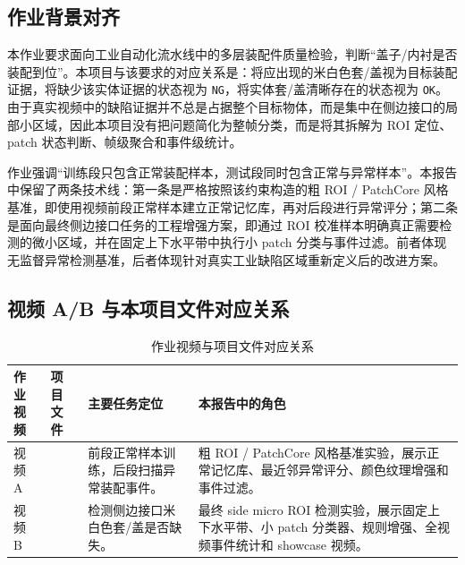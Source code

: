 \documentclass[a4paper,12pt]{article}
\newcommand{\code}[1]{\texttt{#1}}
\begin{document}
\subsection{作业背景对齐}
本作业要求面向工业自动化流水线中的多层装配件质量检验，判断“盖子/内衬是否装配到位”。本项目与该要求的对应关系是：将应出现的米白色套/盖视为目标装配证据，将缺少该实体证据的状态视为 \code{NG}，将实体套/盖清晰存在的状态视为 \code{OK}。由于真实视频中的缺陷证据并不总是占据整个目标物体，而是集中在侧边接口的局部小区域，因此本项目没有把问题简化为整帧分类，而是将其拆解为 ROI 定位、patch 状态判断、帧级聚合和事件级统计。

作业强调“训练段只包含正常装配样本，测试段同时包含正常与异常样本”。本报告中保留了两条技术线：第一条是严格按照该约束构造的粗 ROI / PatchCore 风格基准，即使用视频前段正常样本建立正常记忆库，再对后段进行异常评分；第二条是面向最终侧边接口任务的工程增强方案，即通过 ROI 校准样本明确真正需要检测的微小区域，并在固定上下水平带中执行小 patch 分类与事件过滤。前者体现无监督异常检测基准，后者体现针对真实工业缺陷区域重新定义后的改进方案。

\subsection{视频 A/B 与本项目文件对应关系}
\begin{table}[H]
\centering
\caption{作业视频与项目文件对应关系}
\label{tab:assignment-video-map}
\small
\begin{tabularx}{\textwidth}{L{0.14\textwidth}L{0.24\textwidth}L{0.24\textwidth}Y}
\toprule
作业视频 & 项目文件 & 主要任务定位 & 本报告中的角色 \\
\midrule
视频 A &  & 前段正常样本训练，后段扫描异常装配事件。 & 粗 ROI / PatchCore 风格基准实验，展示正常记忆库、最近邻异常评分、颜色纹理增强和事件过滤。 \\
视频 B &  & 检测侧边接口米白色套/盖是否缺失。 & 最终 side micro ROI 检测实验，展示固定上下水平带、小 patch 分类器、规则增强、全视频事件统计和 showcase 视频。 \\
\bottomrule
\end{tabularx}
\end{table}
\end{document}
